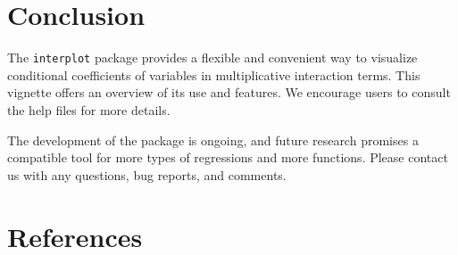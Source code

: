 \documentclass[
  article]{jss}
\begin{document}
\hypertarget{sec-conclusion}{%
\section{Conclusion}\label{sec-conclusion}}

The \texttt{interplot} package provides a flexible and convenient way to
visualize conditional coefficients of variables in multiplicative
interaction terms. This vignette offers an overview of its use and
features. We encourage users to consult the help files for more details.

The development of the package is ongoing, and future research promises
a compatible tool for more types of regressions and more functions.
Please contact us with any questions, bug reports, and comments.

\hypertarget{sec-references}{%
\section*{References}\label{sec-references}}

\renewcommand{\bibsection}{}

\end{document}
